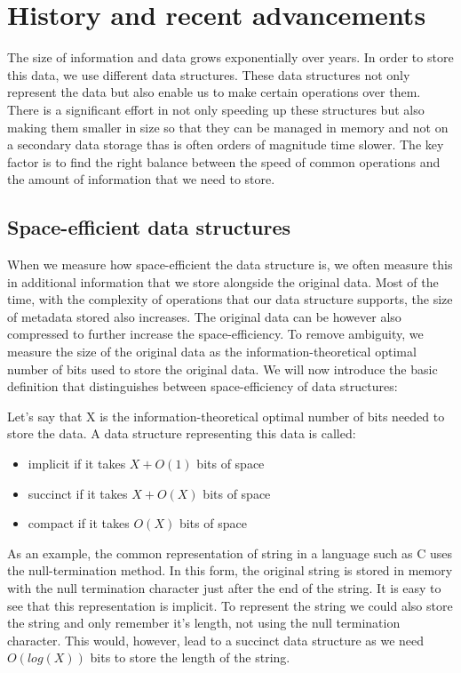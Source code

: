 \chapter{History and recent advancements}
\label{kap:kap1}

The size of information and data grows exponentially over years. In order to store this data, we use different data structures. These data structures not only represent the data but also enable us to make certain operations over them. There is a significant effort in not only speeding up these structures but also making them smaller in size so that they can be managed in memory and not on a secondary data storage thas is often orders of magnitude time slower. The key factor is to find the right balance between the speed of common operations and the amount of information that we need to store.

\section{Space-efficient data structures}

When we measure how space-efficient the data structure is, we often measure this in additional information that we store alongside the original data. Most of the time, with the complexity of operations that our data structure supports, the size of metadata stored also increases. The original data can be however also compressed to further increase the space-efficiency. To remove ambiguity, we measure the size of the original data as the information-theoretical optimal number of bits used to store the original data. We will now introduce the basic definition that distinguishes between space-efficiency of data structures:

Let's say that X is the information-theoretical optimal number of bits needed to store the data. A data structure representing this data is called:
\begin{itemize}
\item implicit if it takes $X + O(1)$ bits of space
\item succinct if it takes $X + O(X)$ bits of space
\item compact if it takes $O(X)$ bits of space
\end{itemize}

As an example, the common representation of string in a language such as C uses the null-termination method. In this form, the original string is stored in memory with the null termination character just after the end of the string. It is easy to see that this representation is implicit. To represent the string we could also store the string and only remember it's length, not using the null termination character. This would, however, lead to a succinct data structure as we need $O(log(X))$ bits to store the length of the string.

